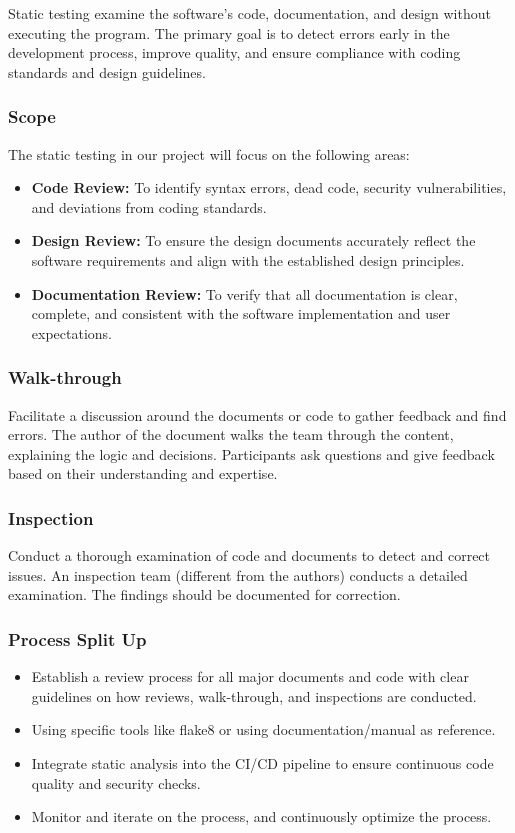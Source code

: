 \documentclass[12pt, titlepage]{article}
\begin{document}
\begin{enumerate}
Static testing examine the software's code, documentation, and design without executing the program. The primary goal is to detect errors early in the development process, improve quality, and ensure compliance with coding standards and design guidelines.

\subsubsection{Scope}

The static testing in our project will focus on the following areas:
\begin{itemize}
    \item \textbf{Code Review:} To identify syntax errors, dead code, security vulnerabilities, and deviations from coding standards.
    \item \textbf{Design Review:} To ensure the design documents accurately reflect the software requirements and align with the established design principles.
    \item \textbf{Documentation Review:} To verify that all documentation is clear, complete, and consistent with the software implementation and user expectations.
\end{itemize}


\subsubsection{Walk-through}

Facilitate a discussion around the documents or code to gather feedback and find errors. The author of the document walks the team through the content, explaining the logic and decisions. Participants ask questions and give feedback based on their understanding and expertise.

\subsubsection{Inspection}

Conduct a thorough examination of code and  documents to detect and correct issues. An inspection team (different from the authors) conducts a detailed examination. The findings should be documented for correction.

\subsubsection{Process Split Up}
\begin{itemize}
    \item Establish a review process for all major documents and code with clear guidelines on how reviews, walk-through, and inspections are conducted.
    \item Using specific tools like flake8 or using documentation/manual as reference.
    \item Integrate static analysis into the CI/CD pipeline to ensure continuous code quality and security checks.
    \item Monitor and iterate on the process, and continuously optimize the process.
    

\end{itemize}
\end{enumerate}
\end{document}
